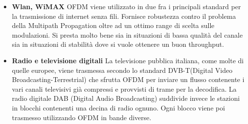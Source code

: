 \begin{itemize}
\begin{itemize}
\end{itemize}
\begin{itemize}
	\item \textbf{Wlan, WiMAX}
	  OFDM viene utilizzato in due fra i principali standard per la trasmissione di internet senza fili. Fornisce robustezza contro il problema della Multipath Propagation oltre ad un ottimo range di scelta sulle modulazioni. Si presta molto bene sia in situazioni di bassa qualità del canale sia in situazioni di stabilità dove si vuole ottenere un buon throughput.
\end{itemize}
\begin{itemize}
	\item \textbf{Radio e televisione digitali} La televisione pubblica italiana, come molte di quelle europee, viene trasmessa secondo lo standard DVB-T(Digital Video Broadcasting-Terrestrial) che sfrutta OFDM per inviare un flusso contenente i vari canali televisivi già compressi e provvisti di trame per la decodifica. La radio digitale DAB (Digital Audio Broadcasting) suddivide invece le stazioni in blocchi contenenti una decina di radio ognuno. Ogni blocco viene poi trasmesso utilizzando OFDM in bande diverse.
\end{itemize}


\end{itemize}

